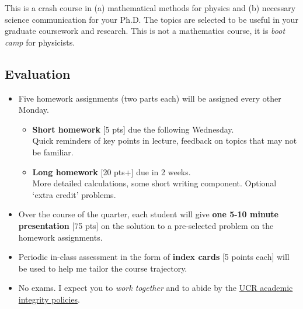 \documentclass[12pt]{article}
\numberwithin{equation}{section}    %
\begin{document}
This is a crash course in (a) mathematical methods for physics and (b) necessary science communication for your Ph.D. The topics are selected to be useful in your graduate coursework and research. This is not a mathematics course, it is \emph{boot camp} for physicists. 


\subsection*{Evaluation}
\begin{itemize}
\item Five homework assignments (two parts each) will be assigned every other Monday.
	\begin{itemize}
	\item \textbf{Short homework} [5 pts] due the following Wednesday.\\ 
		Quick reminders of key points in lecture, feedback on topics that may not be familiar.
	\item \textbf{Long homework} [20 pts+] due in 2 weeks.\\ 
		More detailed calculations, some short writing component. Optional `extra credit' problems.
	\end{itemize}

\item Over the course of the quarter, each student will give \textbf{one 5-10 minute presentation} [75 pts] on the solution to a pre-selected problem on the homework assignments. 

\item Periodic in-class assessment in the form of \textbf{index cards} [5 points each] will be used to help me tailor the course trajectory. 

\item No exams. I expect you to \emph{work together} and to abide by the \href{http://conduct.ucr.edu/policies/academicintegrity.html}{UCR academic integrity policies}.
\end{itemize}
\end{document}
